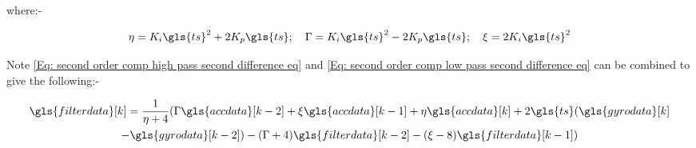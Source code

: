 where:-

\begin{equation*}
\eta = K_i\gls{ts}^2 + 2K_p\gls{ts};~~~ \Gamma = K_i\gls{ts}^2 - 2 K_p\gls{ts};~~~ \xi = 2K_i\gls{ts}^2
\end{equation*}

Note \eqref{Eq: second order comp high pass second difference eq} and \eqref{Eq: second order comp low pass second difference eq} can be combined to give the following:-

\begin{multline}
\gls{filterdata} [k] = \frac{1}{\eta +4}(\Gamma \gls{accdata} [k-2] + \xi \gls{accdata} [k-1] + \eta \gls{accdata} [k] + 2\gls{ts} ( \gls{gyrodata} [k] \\
- \gls{gyrodata} [k -2] )   - (\Gamma + 4)\gls{filterdata} [k-2] - (\xi - 8) \gls{filterdata} [k - 1] ) \label{Eq: full dfference equation for the second order filter}
\end{multline}



